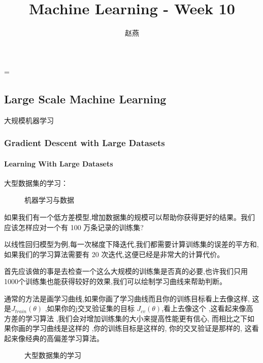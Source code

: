 \documentclass{article}
\title{Machine Learning - Week 10}
\author{赵燕}
\date{}
\begin{document}
 
\hfuzz=\maxdimen
{}
\begin{CJK}{UTF8}{gbsn} 
\maketitle
\renewcommand\contentsname{目录}
\renewcommand\figurename{图}
\tableofcontents
\newpage

\part{Large Scale Machine Learning}
\subparagraph{}
大规模机器学习
\section{Gradient Descent with Large Datasets}
\subsection{Learning With Large Datasets}
\subparagraph{}
大型数据集的学习：
\begin{figure}[H]
\caption{机器学习与数据}
\label{fig:1001}
\end{figure}
\subparagraph{}
如果我们有一个低方差模型,增加数据集的规模可以帮助你获得更好的结果。我们应该怎样应对一个有 100 万条记录的训练集?
\subparagraph{}
以线性回归模型为例,每一次梯度下降迭代,我们都需要计算训练集的误差的平方和,如果我们的学习算法需要有 20 次迭代,这便已经是非常大的计算代价。
\subparagraph{}
首先应该做的事是去检查一个这么大规模的训练集是否真的必要,也许我们只用 1000个训练集也能获得较好的效果,我们可以绘制学习曲线来帮助判断。
\subparagraph{}
通常的方法是画学习曲线,如果你画了学习曲线而且你的训练目标看上去像这样, 这是$J_{train}(θ)$ ,如果你的j交叉验证集的目标 $J_{cv}(θ)$,看上去像这个 ,这看起来像高方差的学习算法 ,我们会对增加训练集的大小来提高性能更有信心, 而相比之下如果你画的学习曲线是这样的 ,你的训练目标是这样的, 你的交叉验证是那样的, 这看起来像经典的高偏差学习算法。
\begin{figure}[H]
\label{fig:11103}
\caption{大型数据集的学习}
\end{figure}
\begin{figure}[H]
\label{fig:11102}
\end{figure}

\end{CJK}
\end{document}
